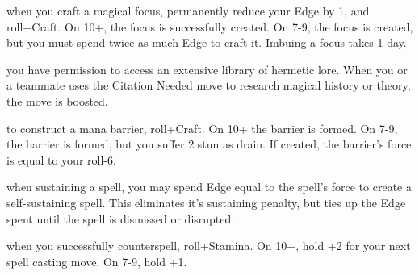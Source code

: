 \begin{dossier}
\begin{dossiermovebar}
\begin{moveoptions}



\end{moveoptions}

       when you craft a magical focus, permanently reduce your Edge by 1, and roll+Craft. On 10+, 
        the focus is successfully created. On 7-9, the focus is created, but you must spend twice as 
        much Edge to craft it. Imbuing a focus takes 1 day. 

         you have permission to access an extensive library of hermetic lore. 
          When you or a teammate uses the Citation Needed move to research magical history or 
          theory, the move is boosted. 

 to construct a mana barrier, roll+Craft. On 10+ the barrier is formed. On 7-9, the barrier is formed, but you suffer 2 stun as drain. If created, the barrier's force is equal to your roll-6.

 when sustaining a spell, you may spend Edge equal to the spell's force to create a self-sustaining spell. This eliminates it's sustaining penalty, but ties up the Edge spent until the spell is dismissed or disrupted.

 when you successfully counterspell, roll+Stamina. On 10+, hold +2 for your next spell casting move. On 7-9, hold +1. 


\begin{comment}
             \unselectedMove{Initiate:} when you hit the books, you may also spend the Prep earned to: 
\begin{moveoptions}

              \moveoption{ reduce a spell’s Essence cost by 1 (this can reduce the cost to 0) }

                \moveoption{ boost a Cast a Spell move }

                \moveoption{ restore 1 essence }
\end{moveoptions}
\end{comment}



\end{dossiermovebar}%
\end{dossier}

